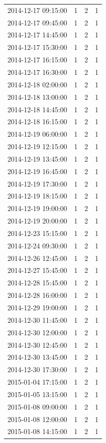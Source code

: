 \begin{tabular}{lrrr}
2014-12-17 09:15:00 & 1 & 2 & 1 \\
2014-12-17 09:45:00 & 1 & 2 & 1 \\
2014-12-17 14:45:00 & 1 & 2 & 1 \\
2014-12-17 15:30:00 & 1 & 2 & 1 \\
2014-12-17 16:15:00 & 1 & 2 & 1 \\
2014-12-17 16:30:00 & 1 & 2 & 1 \\
2014-12-18 02:00:00 & 1 & 2 & 1 \\
2014-12-18 13:00:00 & 1 & 2 & 1 \\
2014-12-18 14:45:00 & 1 & 2 & 1 \\
2014-12-18 16:15:00 & 1 & 2 & 1 \\
2014-12-19 06:00:00 & 1 & 2 & 1 \\
2014-12-19 12:15:00 & 1 & 2 & 1 \\
2014-12-19 13:45:00 & 1 & 2 & 1 \\
2014-12-19 16:45:00 & 1 & 2 & 1 \\
2014-12-19 17:30:00 & 1 & 2 & 1 \\
2014-12-19 18:15:00 & 1 & 2 & 1 \\
2014-12-19 19:00:00 & 1 & 2 & 1 \\
2014-12-19 20:00:00 & 1 & 2 & 1 \\
2014-12-23 15:15:00 & 1 & 2 & 1 \\
2014-12-24 09:30:00 & 1 & 2 & 1 \\
2014-12-26 12:45:00 & 1 & 2 & 1 \\
2014-12-27 15:45:00 & 1 & 2 & 1 \\
2014-12-28 15:45:00 & 1 & 2 & 1 \\
2014-12-28 16:00:00 & 1 & 2 & 1 \\
2014-12-29 19:00:00 & 1 & 2 & 1 \\
2014-12-30 11:45:00 & 1 & 2 & 1 \\
2014-12-30 12:00:00 & 1 & 2 & 1 \\
2014-12-30 12:45:00 & 1 & 2 & 1 \\
2014-12-30 13:45:00 & 1 & 2 & 1 \\
2014-12-30 17:30:00 & 1 & 2 & 1 \\
2015-01-04 17:15:00 & 1 & 2 & 1 \\
2015-01-05 13:15:00 & 1 & 2 & 1 \\
2015-01-08 09:00:00 & 1 & 2 & 1 \\
2015-01-08 12:00:00 & 1 & 2 & 1 \\
2015-01-08 14:15:00 & 1 & 2 & 1 \\

\end{tabular}
